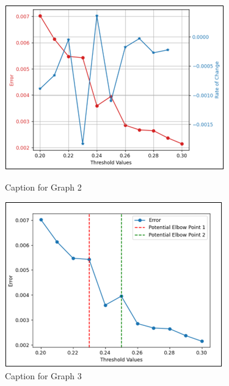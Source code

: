 \documentclass{article}
\begin{document}
\begin{figure}[ht]
    \centering
    \begin{minipage}{0.45\textwidth}
        \centering
        \includegraphics[width=\linewidth]{Graph2.png}
        \caption{Caption for Graph 2}
        \label{fig:graph2}
    \end{minipage}
    \hfill
    \begin{minipage}{0.45\textwidth}
        \centering
        \includegraphics[width=\linewidth]{Graph3.png}
        \caption{Caption for Graph 3}
        \label{fig:graph3}
    \end{minipage}
\end{figure}
\end{document}
